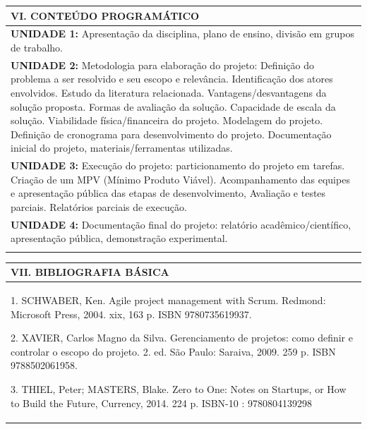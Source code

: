 \documentclass[12pt]{article}
\begin{document}
\begin{longtable}{|L{1.025\textwidth}|} \hline
%
{\bf VI. CONTEÚDO PROGRAMÁTICO } \\ \hline

{\bf UNIDADE 1:} Apresentação da disciplina, plano de ensino, divisão em grupos de trabalho. \\



{\bf UNIDADE 2:}  Metodologia para elaboração do projeto: Definição do problema a ser resolvido e seu escopo e relevância. Identificação dos atores envolvidos. Estudo da literatura relacionada. Vantagens/desvantagens da solução proposta. Formas de avaliação da solução. Capacidade de escala da solução. Viabilidade física/financeira do projeto. Modelagem do projeto. Definição de cronograma para desenvolvimento do projeto.  Documentação inicial do projeto,  materiais/ferramentas utilizadas. \\



{\bf UNIDADE 3:}   Execução do projeto: particionamento do projeto em tarefas. Criação de um MPV (Mínimo Produto Viável). Acompanhamento das equipes e apresentação pública das etapas de desenvolvimento, Avaliação e testes parciais. Relatórios parciais de execução.\\



{\bf UNIDADE 4:} Documentação final do projeto: relatório acadêmico/científico, apresentação pública, demonstração experimental.\\



\\ \hline
\end{longtable} 





\begin{longtable}{|L{1.025\textwidth}|} \hline
%
{\bf VII. BIBLIOGRAFIA BÁSICA} \\ . SCHWABER, Ken. Agile project management with Scrum. Redmond: Microsoft Press, 2004. xix, 163 p. ISBN 9780735619937.

2. XAVIER, Carlos Magno da Silva. Gerenciamento de projetos: como definir e controlar o escopo do projeto. 2. ed. São Paulo: Saraiva, 2009. 259 p. ISBN 9788502061958.

3. THIEL, Peter; MASTERS, Blake. Zero to One: Notes on Startups, or How to Build the Future, Currency, 2014. 224 p. ISBN-10 : 9780804139298


 \\ \hline
\end{longtable}
\end{document}
